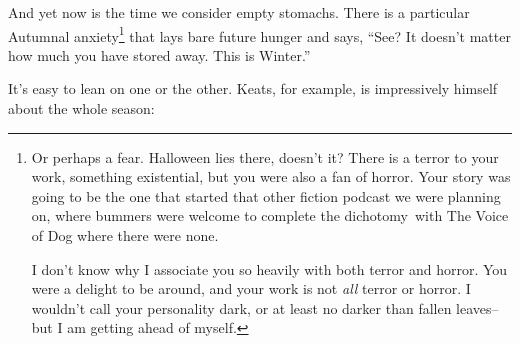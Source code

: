 \documentclass[12pt,oneside]{memoir}
\begin{document}
And yet now is the time we consider empty stomachs. There is a particular Autumnal anxiety\footnote{Or perhaps a fear. Halloween lies there, doesn't it? There is a terror to your work, something existential, but you were also a fan of horror. Your story was going to be the one that started that other fiction podcast we were planning on, where bummers were welcome to complete the dichotomy\footnotemark~with The Voice of Dog where there were none.\par
I don't know why I associate you so heavily with both terror and horror. You were a delight to be around, and your work is not \emph{all} terror or horror. I wouldn't call your personality dark, or at least no darker than fallen leaves-- but I am getting ahead of myself.}
 that lays bare future hunger and says, ``See? It doesn't matter how much you have stored away. This is Winter.''

It's easy to lean on one or the other. Keats, for example, is impressively himself about the whole season:
\end{document}
